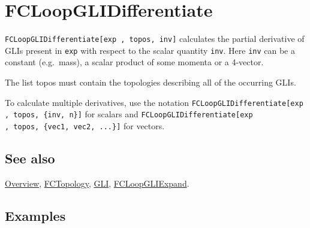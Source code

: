 \documentclass[../FeynCalcManual.tex]{subfiles}
\begin{document}
\hypertarget{fcloopglidifferentiate}{
\section{FCLoopGLIDifferentiate}\label{fcloopglidifferentiate}}

\texttt{FCLoopGLIDifferentiate[\allowbreak{}exp ,\ \allowbreak{}topos,\ \allowbreak{}inv]}
calculates the partial derivative of GLIs present in \texttt{exp} with
respect to the scalar quantity \texttt{inv}. Here \texttt{inv} can be a
constant (e.g.~mass), a scalar product of some momenta or a 4-vector.

The list topos must contain the topologies describing all of the
occurring GLIs.

To calculate multiple derivatives, use the notation
\texttt{FCLoopGLIDifferentiate[\allowbreak{}exp ,\ \allowbreak{}topos,\ \allowbreak{}\{\allowbreak{}inv,\ \allowbreak{}n\}]}
for scalars and
\texttt{FCLoopGLIDifferentiate[\allowbreak{}exp ,\ \allowbreak{}topos,\ \allowbreak{}\{\allowbreak{}vec1,\ \allowbreak{}vec2,\ \allowbreak{}...\}]}
for vectors.

\subsection{See also}

\hyperlink{toc}{Overview}, \hyperlink{fctopology}{FCTopology},
\hyperlink{gli}{GLI}, \hyperlink{fcloopgliexpand}{FCLoopGLIExpand}.

\subsection{Examples}

\begin{Shaded}
\begin{Highlighting}[]
\OperatorTok{[}\OperatorTok{[}\OperatorTok{,} \OperatorTok{\{}\OperatorTok{,} \OperatorTok{,} \OperatorTok{\}],} 
  \OperatorTok{\{}\OperatorTok{[}\OperatorTok{,} \OperatorTok{\{}\OperatorTok{[\{}\OperatorTok{,}\OperatorTok{\}],}\OperatorTok{[\{}\OperatorTok{,}\OperatorTok{\}],}\OperatorTok{[\{}\SpecialCharTok{{-}}\OperatorTok{,}\OperatorTok{\}]\},} \OperatorTok{\{}\OperatorTok{,}\OperatorTok{\},} \OperatorTok{\{\},} \OperatorTok{\{\},} \OperatorTok{\{\}]\},}\OperatorTok{]}
\end{Highlighting}
\end{Shaded}
\end{document}
